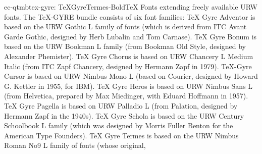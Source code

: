 \documentclass{ddltxtyp}
\begin{document}
\begin{package}{ec-qtmb}{tex-gyre: TeXGyreTermes-Bold}{{\TeX} Fonts extending freely available URW fonts.}
The {\TeX}-GYRE bundle consists of six font families: {\TeX} Gyre
Adventor is based on the URW Gothic L family of fonts (which is
derived from ITC Avant Garde Gothic, designed by Herb Lubalin
and Tom Carnase). {\TeX} Gyre Bonum is based on the URW Bookman L
family (from Bookman Old Style, designed by Alexander
Phemister). {\TeX} Gyre Chorus is based on URW Chancery L Medium
Italic (from ITC Zapf Chancery, designed by Hermann Zapf in
1979). {\TeX}-Gyre Cursor is based on URW Nimbus Mono L (based on
Courier, designed by Howard G. Kettler in 1955, for IBM). {\TeX}
Gyre Heros is based on URW Nimbus Sans L (from Helvetica,
prepared by Max Miedinger, with Eduard Hoffmann in 1957). {\TeX}
Gyre Pagella is based on URW Palladio L (from Palation,
designed by Hermann Zapf in the 1940s). {\TeX} Gyre Schola is
based on the URW Century Schoolbook L family (which was
designed by Morris Fuller Benton for the American Type
Founders). {\TeX} Gyre Termes is based on the URW Nimbus Roman No9
L family of fonts (whose original, %
\end{package}
\end{document}
